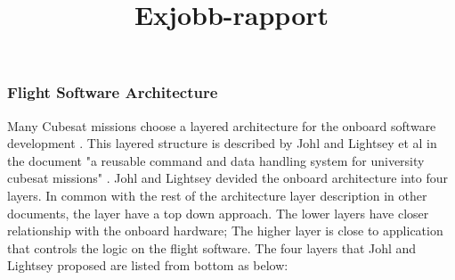 \documentclass[a4paper]{article}
\title{Exjobb-rapport}
\begin{document}

\subsubsection{Flight Software Architecture}
\label{subsubsec:FSA}

Many Cubesat missions choose a layered architecture for the onboard software development \cite{Addaim2010-ym}\cite{compass-1}\cite{Greg_D_Manyak2011-xr}\cite{cadh-architecture}\cite{KySat-2}. This layered structure is described by Johl and Lightsey et al in the document "a reusable command and data handling system for university cubesat missions" \cite{reusable-cadh}. Johl and Lightsey devided the onboard architecture into four layers. In common with the rest of the architecture layer description in other documents, the layer have a top down approach. The lower layers have closer relationship with the onboard hardware; The higher layer is close to application that controls the logic on the flight software. The four layers that Johl and Lightsey proposed are listed from bottom as below: 
\end{document}

